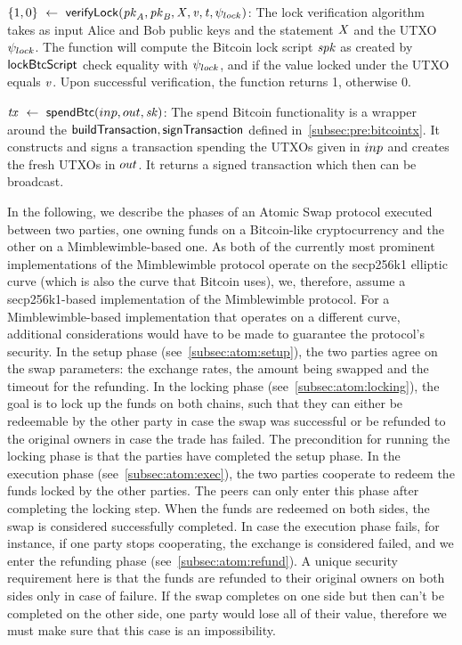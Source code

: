 \begin{asparaitem}
    \item $\{ 1,0 \} ~\leftarrow~ \mathsf{verifyLock} (\mathit{pk}_{\mathit{A}},\mathit{pk}_{\mathit{B}},\mathit{X},\mathit{v},\mathit{t},\psi_{lock})$:
    The lock verification algorithm takes as input Alice and Bob public keys and the statement $\mathit{X}$ and the UTXO $\psi_{lock}$.
    The function will compute the Bitcoin lock script $\mathit{spk}$ as created by $\mathsf{lockBtcScript}$ check equality with $\psi_{lock}$, and if the value locked under the UTXO equals $\mathit{v}$.
    Upon successful verification, the function returns 1, otherwise 0.
    \item $\mathit{tx} ~\leftarrow~ \mathsf{spendBtc}(inp,out,\mathit{sk})$:
    The spend Bitcoin functionality is a wrapper around the $\mathsf{buildTransaction}, \mathsf{signTransaction}$ defined in~\cref{subsec:pre:bitcointx}.
    It constructs and signs a transaction spending the UTXOs given in $inp$ and creates the fresh UTXOs in $out$.
    It returns a signed transaction which then can be broadcast.
\end{asparaitem}


In the following, we describe the phases of an Atomic Swap protocol executed between two parties, one owning funds on a Bitcoin-like cryptocurrency and the other on a Mimblewimble-based one.
As both of the currently most prominent implementations of the Mimblewimble protocol operate on the secp256k1 elliptic curve (which is also the curve that Bitcoin uses), we, therefore, assume a secp256k1-based implementation of the Mimblewimble protocol.
For a Mimblewimble-based implementation that operates on a different curve, additional considerations would have to be made to guarantee the protocol's security.
In the setup phase (see~\cref{subsec:atom:setup}), the two parties agree on the swap parameters: the exchange rates, the amount being swapped and the timeout for the refunding.
In the locking phase (see~\cref{subsec:atom:locking}), the goal is to lock up the funds on both chains, such that they can either be redeemable by the other party in case the swap was successful or be refunded to the original owners in case the trade has failed.
The precondition for running the locking phase is that the parties have completed the setup phase.
In the execution phase (see~\cref{subsec:atom:exec}), the two parties cooperate to redeem the funds locked by the other parties.
The peers can only enter this phase after completing the locking step.
When the funds are redeemed on both sides, the swap is considered successfully completed.
In case the execution phase fails, for instance, if one party stops cooperating, the exchange is considered failed, and we enter the refunding phase (see~\cref{subsec:atom:refund}).
A unique security requirement here is that the funds are refunded to their original owners on both sides only in case of failure.
If the swap completes on one side but then can't be completed on the other side, one party would lose all of their value, therefore we must make sure that this case is an impossibility.

